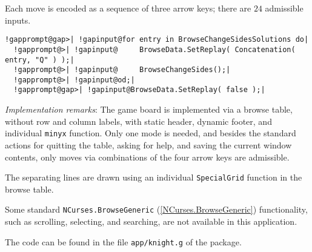 \documentclass[a4paper,11pt]{report}
\begin{document}
{{{ Each move is encoded as a sequence of three arrow keys; there are $24$ admissible inputs. 

 
\begin{Verbatim}[commandchars=!@|,fontsize=\small,frame=single,label=Example]
  !gapprompt@gap>| !gapinput@for entry in BrowseChangeSidesSolutions do|
  !gapprompt@>| !gapinput@     BrowseData.SetReplay( Concatenation( entry, "Q" ) );|
  !gapprompt@>| !gapinput@     BrowseChangeSides();|
  !gapprompt@>| !gapinput@od;|
  !gapprompt@gap>| !gapinput@BrowseData.SetReplay( false );|
\end{Verbatim}
 

 \emph{Implementation remarks}: The game board is implemented via a browse table, without row and column
labels, with static header, dynamic footer, and individual \texttt{minyx} function. Only one mode is needed, and besides the standard actions for
quitting the table, asking for help, and saving the current window contents,
only moves via combinations of the four arrow keys are admissible. 

 The separating lines are drawn using an individual \texttt{SpecialGrid} function in the browse table. 

 Some standard \texttt{NCurses.BrowseGeneric} (\ref{NCurses.BrowseGeneric}) functionality, such as scrolling, selecting, and searching, are not available
in this application. 

 The code can be found in the file \texttt{app/knight.g} of the package. }

 }

 
}
\end{document}

